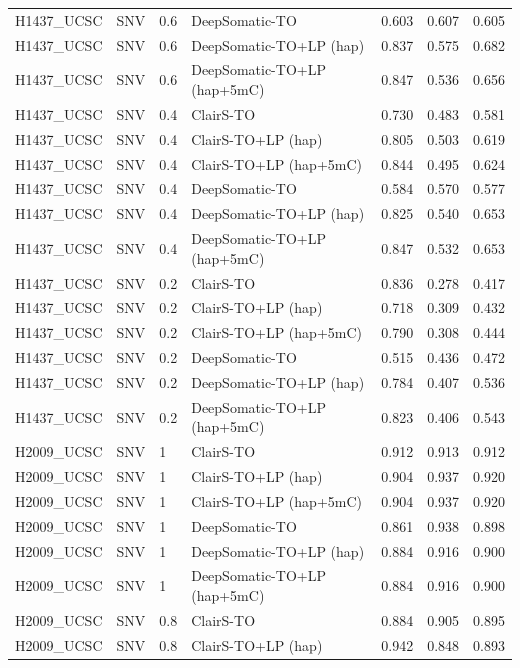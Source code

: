 \documentclass[pdflatex,sn-nature]{sn-jnl}
\begin{document}
{\begin{longtable}{@{}llllccc@{}}
  H1437\_UCSC & SNV & 0.6 & DeepSomatic-TO & 0.603 & 0.607 & 0.605 \\
  H1437\_UCSC & SNV & 0.6 & DeepSomatic-TO+LP (hap) & 0.837 & 0.575 & 0.682 \\
  H1437\_UCSC & SNV & 0.6 & DeepSomatic-TO+LP (hap+5mC) & 0.847 & 0.536 & 0.656 \\
  H1437\_UCSC & SNV & 0.4 & ClairS-TO & 0.730 & 0.483 & 0.581 \\
  H1437\_UCSC & SNV & 0.4 & ClairS-TO+LP (hap) & 0.805 & 0.503 & 0.619 \\
  H1437\_UCSC & SNV & 0.4 & ClairS-TO+LP (hap+5mC) & 0.844 & 0.495 & 0.624 \\
  H1437\_UCSC & SNV & 0.4 & DeepSomatic-TO & 0.584 & 0.570 & 0.577 \\
  H1437\_UCSC & SNV & 0.4 & DeepSomatic-TO+LP (hap) & 0.825 & 0.540 & 0.653 \\
  H1437\_UCSC & SNV & 0.4 & DeepSomatic-TO+LP (hap+5mC) & 0.847 & 0.532 & 0.653 \\
  H1437\_UCSC & SNV & 0.2 & ClairS-TO & 0.836 & 0.278 & 0.417 \\
  H1437\_UCSC & SNV & 0.2 & ClairS-TO+LP (hap) & 0.718 & 0.309 & 0.432 \\
  H1437\_UCSC & SNV & 0.2 & ClairS-TO+LP (hap+5mC) & 0.790 & 0.308 & 0.444 \\
  H1437\_UCSC & SNV & 0.2 & DeepSomatic-TO & 0.515 & 0.436 & 0.472 \\
  H1437\_UCSC & SNV & 0.2 & DeepSomatic-TO+LP (hap) & 0.784 & 0.407 & 0.536 \\
  H1437\_UCSC & SNV & 0.2 & DeepSomatic-TO+LP (hap+5mC) & 0.823 & 0.406 & 0.543 \\
  H2009\_UCSC & SNV & 1 & ClairS-TO & 0.912 & 0.913 & 0.912 \\
  H2009\_UCSC & SNV & 1 & ClairS-TO+LP (hap) & 0.904 & 0.937 & 0.920 \\
  H2009\_UCSC & SNV & 1 & ClairS-TO+LP (hap+5mC) & 0.904 & 0.937 & 0.920 \\
  H2009\_UCSC & SNV & 1 & DeepSomatic-TO & 0.861 & 0.938 & 0.898 \\
  H2009\_UCSC & SNV & 1 & DeepSomatic-TO+LP (hap) & 0.884 & 0.916 & 0.900 \\
  H2009\_UCSC & SNV & 1 & DeepSomatic-TO+LP (hap+5mC) & 0.884 & 0.916 & 0.900 \\
  H2009\_UCSC & SNV & 0.8 & ClairS-TO & 0.884 & 0.905 & 0.895 \\
  H2009\_UCSC & SNV & 0.8 & ClairS-TO+LP (hap) & 0.942 & 0.848 & 0.893 \\

\end{longtable}}
\end{document}
